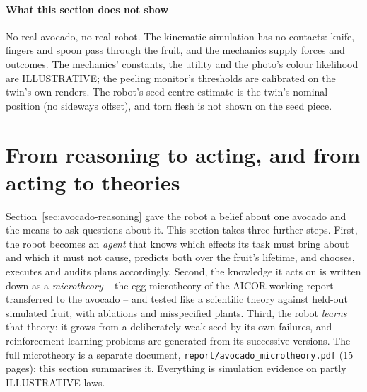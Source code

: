 \documentclass[10.5pt,a4paper]{article}
\begin{document}
\paragraph{What this section does not show} No real avocado, no real robot. The kinematic simulation has no
contacts: knife, fingers and spoon pass through the fruit, and the mechanics supply forces and outcomes. The
mechanics' constants, the utility and the photo's colour likelihood are ILLUSTRATIVE; the peeling monitor's
thresholds are calibrated on the twin's own renders. The robot's seed-centre estimate is the twin's nominal position
(no sideways offset), and torn flesh is not shown on the seed piece.
\clearpage\section[From reasoning to acting, and from acting to theories]{From reasoning to acting, and from
acting to theories}\label{sec:avocado-theory}
Section~\ref{sec:avocado-reasoning} gave the robot a belief about one avocado and the means to ask questions about it.
This section takes three further steps. First, the robot becomes an \emph{agent} that knows which effects its task
must bring about and which it must not cause, predicts both over the fruit's lifetime, and chooses, executes and
audits plans accordingly. Second, the knowledge it acts on is written down as a \emph{microtheory} -- the egg
microtheory of the AICOR working report transferred to the avocado -- and tested like a scientific theory against
held-out simulated fruit, with ablations and misspecified plants. Third, the robot \emph{learns} that theory: it
grows from a deliberately weak seed by its own failures, and reinforcement-learning problems are generated from its
successive versions. The full microtheory is a separate document, \texttt{report/avocado\_microtheory.pdf}
(15 pages); this section summarises it. Everything is simulation evidence on partly ILLUSTRATIVE laws.
\end{document}
